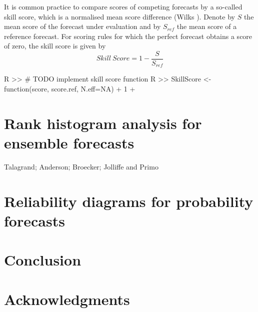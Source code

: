 \documentclass[article]{jss}
\begin{document}
It is common practice to compare scores of competing forecasts by a so-called skill score, which is a normalised mean score difference (Wilks \citep{wilks}).
Denote by $S$ the mean score of the forecast under evaluation and by $S_{ref}$ the mean score of a reference forecast.
For scoring rules for which the perfect forecast obtains a score of zero, the skill score is given by
%
\begin{equation}
Skill\ Score = 1 - \frac{S}{S_{ref}}
\end{equation}

\begin{Schunk}
\begin{Sinput}
R >> # TODO implement skill score function
R >> SkillScore <- function(score, score.ref, N.eff=NA) {
+   1
+ }
\end{Sinput}
\end{Schunk}


\section{Rank histogram analysis for ensemble forecasts}

Talagrand; Anderson; Broecker; Jolliffe and Primo

\section{Reliability diagrams for probability forecasts}


\section{Conclusion}

\section*{Acknowledgments}



\end{document}
